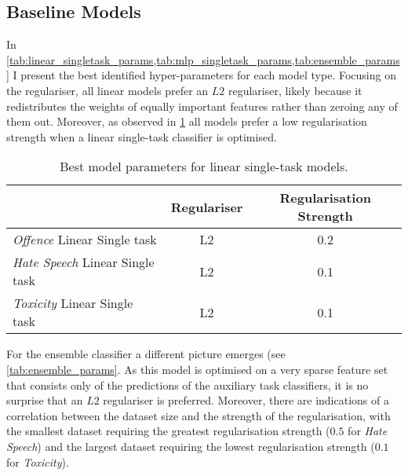 \subsection{Baseline Models}

In \cref{tab:linear_singletask_params,tab:mlp_singletask_params,tab:ensemble_params} I present the best identified hyper-parameters for each model type.
Focusing on the regulariser, all linear models prefer an $L2$ regulariser, likely because it redistributes the weights of equally important features rather than zeroing any of them out.
Moreover, as observed in \cref{tab:linear_singletask_params} all models prefer a low regularisation strength when a linear single-task classifier is optimised.

\begin{table}[h]
  \centering
  \begin{tabular}{l|cc}
                                            & Regulariser & Regularisation Strength \\\hline
    \textit{Offence} Linear Single task     & L2          & 0.2                     \\
    \textit{Hate Speech} Linear Single task & L2          & 0.1                     \\
    \textit{Toxicity} Linear Single task    & L2          & 0.1
  \end{tabular}
  \caption{Best model parameters for linear single-task models.}
  \label{tab:linear_singletask_params}
\end{table}

For the ensemble classifier a different picture emerges (see \cref{tab:ensemble_params}.
As this model is optimised on a very sparse feature set that consists only of the predictions of the auxiliary task classifiers, it is no surprise that an $L2$ regulariser is preferred.
Moreover, there are indications of a correlation between the dataset size and the strength of the regularisation, with the smallest dataset requiring the greatest regularisation strength ($0.5$ for \textit{Hate Speech}) and the largest dataset requiring the lowest regularisation strength ($0.1$ for \textit{Toxicity}).

